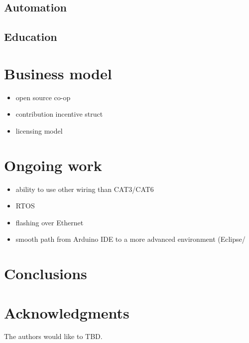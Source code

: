 \documentclass[draft,a4paper]{siamltex}
\begin{document}
\subsection{Automation}

\subsection{Education}
 
\section{Business model}
\label{sec:business}

\begin{itemize}
  \item open source co-op
  \item contribution incentive struct
  \item licensing model
\end{itemize}
 
\section{Ongoing work}
\label{sec:ongoing}

\begin{itemize}
  \item ability to use other wiring than CAT3/CAT6
  \item RTOS
  \item flashing over Ethernet
  \item smooth path from Arduino IDE to a more advanced environment
    (Eclipse/
\end{itemize}

\section{Conclusions}
\label{sec:conclusions}

\section*{Acknowledgments}

The authors would like to TBD.

{}

\end{document}
